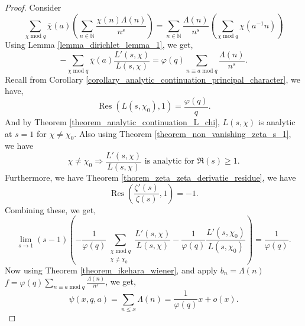 \documentclass{article}
\DeclareMathOperator{\tmod}{mod}
\DeclareMathOperator{\Res}{Res}
\newcommand{\N}[0]{\mathbb{N}}
\begin{document}
\begin{proof}
  Consider 
  \begin{equation*}
    \sum_{\chi\tmod q}\overline{\chi}(a)\left(\sum_{n\in\N}{\frac {\chi(n)\Lambda(n)} {n^s}}\right) =\sum_{n\in\N}{\frac {\Lambda(n)} {n^s}}\left(\sum_{\chi\tmod q}\chi(a^{-1}n)\right)
  \end{equation*}
  Using Lemma \ref{lemma_dirichlet_lemma_1}, we get,
  \begin{equation*}
    -\sum_{\chi\tmod q}\overline{\chi}(a){\frac {L'(s,\chi)} {L(s,\chi)}}= \varphi(q)\sum_{n\equiv a\tmod q}{\frac {\Lambda(n)} {n^s}}.
  \end{equation*}
  Recall from Corollary \ref{corollary_analytic_continuation_principal_character}, we have,
  \begin{equation*}
    \Res(L(s,\chi_0),1) = {\frac {\varphi(q)} {q}}.
  \end{equation*}
  And by Theorem \ref{theorem_analytic_continuation_L_chi}, $L(s,\chi)$ is analytic at $s=1$ for $\chi\not=\chi_0$. Also using Theorem \ref{theorem_non_vanishing_zeta_s_1}, we have 
  \begin{equation*}
    \chi\not=\chi_0\Rightarrow {\frac {L'(s,\chi)}{L(s,\chi)}} \text{ is analytic for $\Re(s)\geq1$}.
  \end{equation*}
  Furthermore, we have Theorem \ref{thorem_zeta_zeta_derivatie_residue}, we have 
  \begin{equation*}
    \Res\left({\frac {\zeta'(s)} {\zeta(s)}},1\right) = -1.
  \end{equation*}
  Combining these, we get, 
  \begin{equation*}
    \lim_{s\to1}(s-1)\left(-{\frac 1{\varphi(q)}}\sum_{\substack{\chi\tmod q\\\chi\not=\chi_0}}{\frac {L'(s,\chi)} {L(s,\chi)}}-{\frac 1 {\varphi(q)}}{\frac {L'(s,\chi_0)} {L(s,\chi_0)}}\right) = {\frac 1 {\varphi(q)}}.
  \end{equation*}
  Now using Theorem \ref{theorem_ikehara_wiener}, and apply $b_n=\Lambda(n)$ $f = \varphi(q)\sum_{n\equiv a\tmod q}{\frac {\Lambda(n)}{n^s}}$, we get,
  \begin{equation*}
    \psi(x,q,a) = \sum_{n\leq x}\Lambda(n) = {\frac 1 {\varphi(q)}}x+o(x).
  \end{equation*}
\end{proof}

\end{document}
